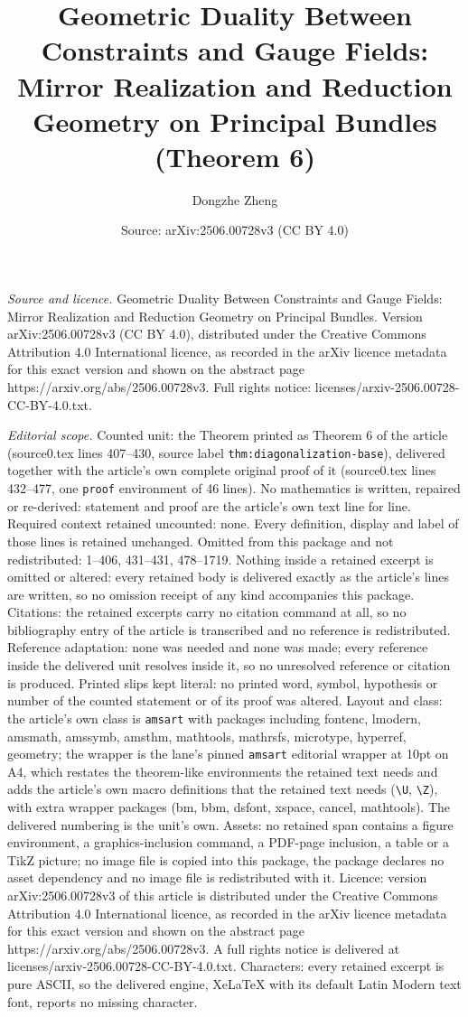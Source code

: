\documentclass[10pt,a4paper]{amsart}
\title[Geometric Duality Between Constraints and Gauge Fields: Mirr]{Geometric Duality Between Constraints and Gauge Fields: Mirror Realization and Reduction Geometry on Principal Bundles (Theorem 6)}
\author{Dongzhe Zheng}
\date{Source: arXiv:2506.00728v3 (CC BY 4.0)}
\begin{document}
\maketitle

\noindent\emph{Source and licence.} Geometric Duality Between Constraints and Gauge Fields: Mirror Realization and Reduction Geometry on Principal Bundles. Version arXiv:2506.00728v3 (CC BY 4.0), distributed under the Creative Commons Attribution 4.0 International licence, as recorded in the arXiv licence metadata for this exact version and shown on the abstract page https://arxiv.org/abs/2506.00728v3. Full rights notice: licenses/arxiv-2506.00728-CC-BY-4.0.txt.\par\smallskip

\noindent\textit{Editorial scope.} Counted unit: the Theorem printed as Theorem 6 of the article (source0.tex lines 407--430, source label \texttt{thm:diagonalization-base}), delivered together with the article's own complete original proof of it (source0.tex lines 432--477, one \texttt{proof} environment of 46 lines). No mathematics is written, repaired or re-derived: statement and proof are the article's own text line for line. Required context retained uncounted: none. Every definition, display and label of those lines is retained unchanged. Omitted from this package and not redistributed: 1--406, 431--431, 478--1719. Nothing inside a retained excerpt is omitted or altered: every retained body is delivered exactly as the article's lines are written, so no omission receipt of any kind accompanies this package. Citations: the retained excerpts carry no citation command at all, so no bibliography entry of the article is transcribed and no reference is redistributed. Reference adaptation: none was needed and none was made; every reference inside the delivered unit resolves inside it, so no unresolved reference or citation is produced. Printed slips kept literal: no printed word, symbol, hypothesis or number of the counted statement or of its proof was altered. Layout and class: the article's own class is \texttt{amsart} with packages including fontenc, lmodern, amsmath, amssymb, amsthm, mathtools, mathrsfs, microtype, hyperref, geometry; the wrapper is the lane's pinned \texttt{amsart} editorial wrapper at 10pt on A4, which restates the theorem-like environments the retained text needs and adds the article's own macro definitions that the retained text needs (\texttt{\textbackslash U}, \texttt{\textbackslash Z}), with extra wrapper packages (bm, bbm, dsfont, xspace, cancel, mathtools). The delivered numbering is the unit's own. Assets: no retained span contains a figure environment, a graphics-inclusion command, a PDF-page inclusion, a table or a TikZ picture; no image file is copied into this package, the package declares no asset dependency and no image file is redistributed with it. Licence: version arXiv:2506.00728v3 of this article is distributed under the Creative Commons Attribution 4.0 International licence, as recorded in the arXiv licence metadata for this exact version and shown on the abstract page https://arxiv.org/abs/2506.00728v3. A full rights notice is delivered at licenses/arxiv-2506.00728-CC-BY-4.0.txt. Characters: every retained excerpt is pure ASCII, so the delivered engine, XeLaTeX with its default Latin Modern text font, reports no missing character.
\end{document}
